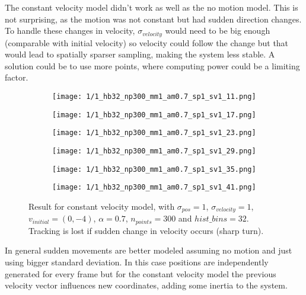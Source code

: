 \documentclass[10pt,a4paper,twoside]{article}
\newcommand{\sweepsize}{0.26}
\begin{document}
The constant velocity model didn't work as well as the no motion model. This is
not surprising, as the motion was not constant but had sudden direction changes.
To handle these changes in velocity, $\sigma_{velocity}$ would need
to be big enough (comparable with initial velocity) so velocity could follow the
change but that would lead to spatially sparser sampling, making the system less stable. A
solution could be to use more points, where computing power could be a limiting factor.

\begin{figure}[h]
    \centering
    \begin{subfigure}{\sweepsize\textwidth}
    \texttt{[image: 1/1\_hb32\_np300\_mm1\_am0.7\_sp1\_sv1\_11.png]} 
    \end{subfigure}
    \begin{subfigure}{\sweepsize\textwidth}
    \texttt{[image: 1/1\_hb32\_np300\_mm1\_am0.7\_sp1\_sv1\_17.png]} 
    \end{subfigure}
    \begin{subfigure}{\sweepsize\textwidth}
    \texttt{[image: 1/1\_hb32\_np300\_mm1\_am0.7\_sp1\_sv1\_23.png]} 
    \end{subfigure}
    \begin{subfigure}{\sweepsize\textwidth}
    \texttt{[image: 1/1\_hb32\_np300\_mm1\_am0.7\_sp1\_sv1\_29.png]} 
    \end{subfigure}
    \begin{subfigure}{\sweepsize\textwidth}
    \texttt{[image: 1/1\_hb32\_np300\_mm1\_am0.7\_sp1\_sv1\_35.png]} 
    \end{subfigure}
    \begin{subfigure}{\sweepsize\textwidth}
    \texttt{[image: 1/1\_hb32\_np300\_mm1\_am0.7\_sp1\_sv1\_41.png]} 
    \end{subfigure}
    \caption{Result for constant velocity model, with $\sigma_{pos}=1$,
    $\sigma_{velocity}=1$, $v_{initial}=(0, -4)$, $\alpha=0.7$, $n_{points}=300$
    and $hist\_bins=32$. Tracking is lost if sudden change in velocity occurs
    (sharp turn).}
\end{figure}

In general sudden movements are better modeled assuming no motion and just using
bigger standard deviation. In this case positions are independently generated for
every frame but for the constant velocity model the previous velocity vector
influences new coordinates, adding some inertia to the system.
\end{document}
